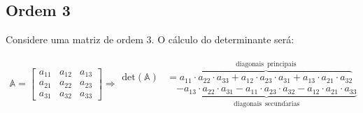\subsection{Ordem 3}

Considere uma matriz de ordem 3. O cálculo do determinante será:

\begin{ceqn}
	\begin{align*}
	\mathbb{A}=\begin{bmatrix}a_{11} & a_{12} & a_{13}\\
	a_{21} & a_{22} & a_{23}\\
	a_{31} & a_{32} & a_{33}
	\end{bmatrix}\Rightarrow
	\begin{split}
	\mathrm{det(\mathbb{A})}&=\overbrace{a_{11}\cdot a_{22}\cdot a_{33}+a_{12}\cdot a_{23}\cdot a_{31}+a_{13}\cdot a_{21}\cdot a_{32}}^{\mathrm{diagonais\,\,\,principais}}\\
	& \quad \underbrace{-a_{13}\cdot a_{22}\cdot a_{31}-a_{11}\cdot a_{23}\cdot a_{32}-a_{12}\cdot a_{21}\cdot a_{33}}_{\mathrm{diagonais\,\,\,secund\acute{a}rias}}
	\end{split}
	\end{align*}
\end{ceqn}


